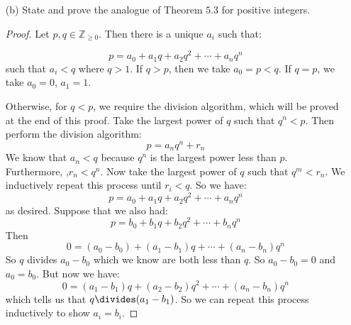 \documentclass{article}
\begin{document}
\begin{itemize}
        \item [(b)] State and prove the analogue of Theorem $5.3$ for positive integers.
            \begin{proof}
                Let $p, q \in \mathbb{Z}_{\geq 0}$. Then there is a unique $a_{i}$ such that: 

                    \begin{equation*}
                        p = a_{0} + a_{1}q + a_{2}q^{2} + \cdots + a_{n}q^{n}
                    \end{equation*}
                such that $a_{i} < q$ where $q > 1$. If $q > p$, then we take $a_{0}  = p < q$. If $q = p$, we take $a_{0} = 0$, $a_{1} = 1$. 

                Otherwise, for $q < p$, we require the division algorithm, which will be proved at the end of this proof. Take the largest power of $q$ such that $q^{n} < p$. Then perform the division algorithm:
                    \begin{equation*}
                        p = a_{n}q^{n} + r_{n}
                    \end{equation*}
                We know that $a_{n} < q$ because $q^{n}$ is the largest power less than $p$. Furthermore, ,$r_{n} < q^{n}$. Now take the largest power of $q$ such that $q^{m} < r_{n}$. We inductively repeat this process until $r_{i} < q$. So we have:
                    \begin{equation*}
                        p = a_{0} + a_{1}q + a_{2}q^{2} + \cdots + a_{n}q^{n}
                    \end{equation*}
                as desired. Suppose that we also had:
                    \begin{equation*}
                        p = b_{0} + b_{1}q + b_{2}q^{2} + \cdots + b_{n}q^{n}
                    \end{equation*}
                Then
                    \begin{equation*}
                        0 = (a_{0} - b_{0}) + (a_{1} - b_{1})q + \cdots + (a_{n} - b_{n})q^{n}
                    \end{equation*}
                So $q$ divides $a_{0} - b_{0}$ which we know are both less than $q$. So $a_{0} - b_{0} = 0$ and $a_{0} = b_{0}$. But now we have:
                    \begin{equation*}
                        0 = (a_{1} - b_{1})q + (a_{2} - b_{2})q^{2} + \cdots  + (a_{n} - b_{n})q^{n}
                    \end{equation*}
                which tells us that $q \divides (a_{1} - b_{1})$. So we can repeat this process inductively to show $a_{i} = b_{i}$.


\end{proof}
\end{itemize}
\end{document}
